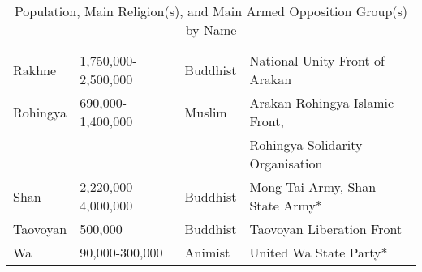 \documentclass{article}
\begin{document}
\begin{table}[htbp]
\begin{tabular}{@{}lllp{5.5cm}@{}}
Rakhne  & 1,750,000-2,500,000 & Buddhist           & National Unity Front of Arakan \\
Rohingya& 690,000-1,400,000   & Muslim             & Arakan Rohingya Islamic Front, \\
        &                     &                    & Rohingya Solidarity Organisation \\
Shan    & 2,220,000-4,000,000 & Buddhist           & Mong Tai Army, Shan State Army* \\
Taovoyan& 500,000             & Buddhist           & Taovoyan Liberation Front \\
Wa      & 90,000-300,000      & Animist            & United Wa State Party* \\
\bottomrule
\end{tabular}
\caption{Population, Main Religion(s), and Main Armed Opposition Group(s) by Name}
\end{table}


\printbibliography{}
\end{document}
